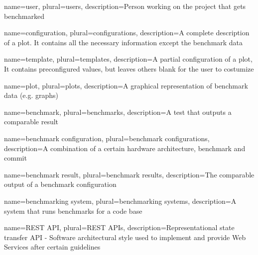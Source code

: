 \makenoidxglossaries

{
	name=user,
	plural=users,
	description={Person working on the project that gets benchmarked}
}

{
	name=configuration,
	plural=configurations,
	description={A complete description of a \gls{plot}. It contains all the necessary information except the benchmark data}
}

{
	name=template,
	plural=templates,
	description={A partial configuration of a \gls{plot}, It contains preconfigured values, but leaves others blank for the user to costumize}
}

{
	name=plot,
	plural=plots,
	description={A graphical representation of benchmark data (e.g. graphs)}
}

{
	name=benchmark,
	plural=benchmarks,
	description={A test that outputs a comparable result}
}

{
	name=benchmark configuration,
	plural=benchmark configurations,
	description={A combination of a certain hardware architecture, \gls{benchmark} and commit}
}

{
	name=benchmark result,
	plural=benchmark results,
	description={The comparable output of a \gls{benchmark configuration}}
}

{
	name=benchmarking system,
	plural=benchmarking systems,
	description={A system that runs benchmarks for a code base}
}

{
	name=REST API,
	plural=REST APIs,
	description={Representational state transfer API - Software architectural style used to implement and provide Web Services after certain guidelines}
}


